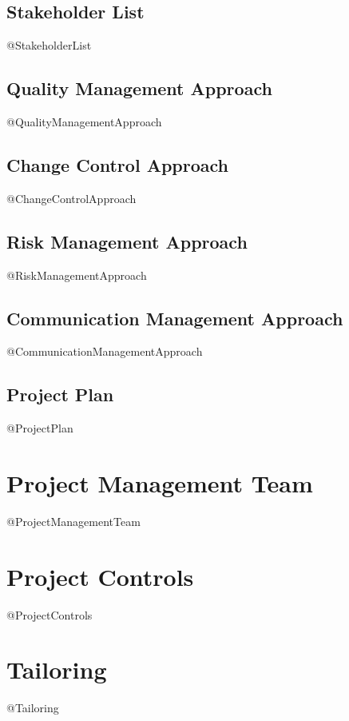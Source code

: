 \documentclass{report}
\begin{document}
\section{Stakeholder List}
@StakeholderList

\section{Quality Management Approach}
@QualityManagementApproach

\section{Change Control Approach}
@ChangeControlApproach

\section{Risk Management Approach}
@RiskManagementApproach

\section{Communication Management Approach}
@CommunicationManagementApproach

\section{Project Plan}
@ProjectPlan

\chapter{Project Management Team}
@ProjectManagementTeam

\chapter{Project Controls}
@ProjectControls

\chapter{Tailoring}
@Tailoring
\end{document}

